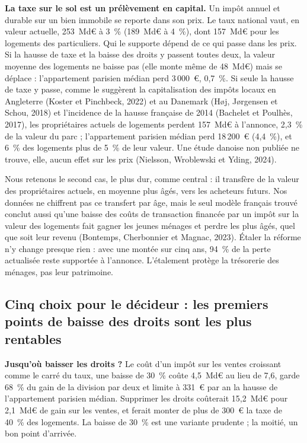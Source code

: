\textbf{La taxe sur le sol est un prélèvement en capital.} Un impôt annuel et durable sur un bien immobile se reporte dans
son prix. Le taux national vaut, en valeur actuelle, 253~Md€ à 3~\% (189~Md€ à 4~\%), dont 157~Md€ pour les logements des
particuliers. Qui le supporte dépend de ce qui passe dans les prix. Si la hausse de taxe et la baisse des droits y passent toutes deux, la valeur
moyenne des logements ne baisse pas (elle monte même de 48~Md€) mais se déplace : l'appartement parisien médian perd
3\,000~€, 0,7~\%. Si seule la hausse de taxe y passe, comme le suggèrent la capitalisation des impôts locaux en Angleterre
(Koster et Pinchbeck, 2022) et au Danemark (Høj, Jørgensen et Schou, 2018) et l'incidence de la hausse française de 2014
(Bachelet et Poulhès, 2017), les propriétaires actuels de logements perdent 157~Md€ à l'annonce, 2,3~\% de la valeur du
parc ; l'appartement parisien médian perd 18\,200~€ (4,4~\%), et 6~\% des logements plus de 5~\% de leur valeur. Une étude
danoise non publiée ne trouve, elle, aucun effet sur les prix (Nielsson, Wroblewski et Yding, 2024).

Nous retenons le second cas, le plus dur, comme central : il transfère de la valeur des propriétaires actuels, en
moyenne plus âgés, vers les acheteurs futurs. Nos données ne chiffrent pas ce transfert par âge, mais le seul modèle
français trouvé conclut aussi qu'une baisse des coûts de transaction financée par un impôt sur la valeur des logements
fait gagner les jeunes ménages et perdre les plus âgés, quel que soit leur revenu (Bontemps, Cherbonnier et Magnac,
2023). Étaler la réforme n'y change presque rien : avec une montée sur cinq ans, 94~\% de
la perte actualisée reste supportée à l'annonce. L'étalement protège la trésorerie des ménages, pas leur patrimoine.

\subsection{Cinq choix pour le décideur : les premiers points de baisse des droits sont les plus rentables}

\textbf{Jusqu'où baisser les droits ?} Le coût d'un impôt sur les ventes croissant comme le carré du taux, une baisse
de 30~\% coûte 4,5~Md€ au lieu de 7,6, garde 68~\% du gain de la
division par deux et limite à 331~€ par an la hausse de l'appartement parisien médian. Supprimer les droits coûterait
15,2~Md€ pour 2,1~Md€ de gain sur les ventes, et ferait monter de plus de 300~€ la taxe de 40~\% des logements. La baisse
de 30~\% est une variante prudente ; la moitié, un bon point d'arrivée.

